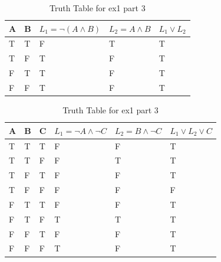 \documentclass[10pt,a4paper]{article}
\begin{document}
\begin{table}[H]
\parbox{.5\linewidth}{

    \begin{tabular}{|l|l|l|l|l|}
        \hline
        A & B & $L_1= \neg(A \wedge B)$ & $L_2= A \wedge B$ & $L_1 \vee L_2$ \\ \hline
        T & T & F                & T          & T                                  \\ \hline
        T & F & T                & F          & T                                  \\ \hline
        F & T & T                & F          & T                                  \\ \hline
        F & F & T                & F          & T                                  \\
        \hline
    \end{tabular}
\caption{Truth Table for ex1 part 1}
\label{tab:ex_1_sub1}
}
\parbox{.45\linewidth}{

    \begin{tabular}{|l|l|l|l|l|l|}
        \hline
        A & B & C & $L_1=\neg A \wedge \neg C$ & $L_2=B \wedge \neg C$ & $L_1 \vee L_2 \vee C$ \\ \hline
        T & T & T & F                        & F                   & T                   \\ \hline
        T & T & F & F                        & T                   & T                   \\ \hline
        T & F & T & F                        & F                   & T                   \\ \hline
        T & F & F & F                        & F                   & F                   \\ \hline
        F & T & T & F                        & F                   & T                   \\ \hline
        F & T & F & T                        & T                   & T                   \\ \hline
        F & F & T & F                        & F                   & T                   \\ \hline
        F & F & F & T                        & F                   & T                   \\
        \hline
    \end{tabular}
\caption{Truth Table for ex1 part 3}

\label{tab:ex_1_sub3}
}
\end{table}
\end{document}
